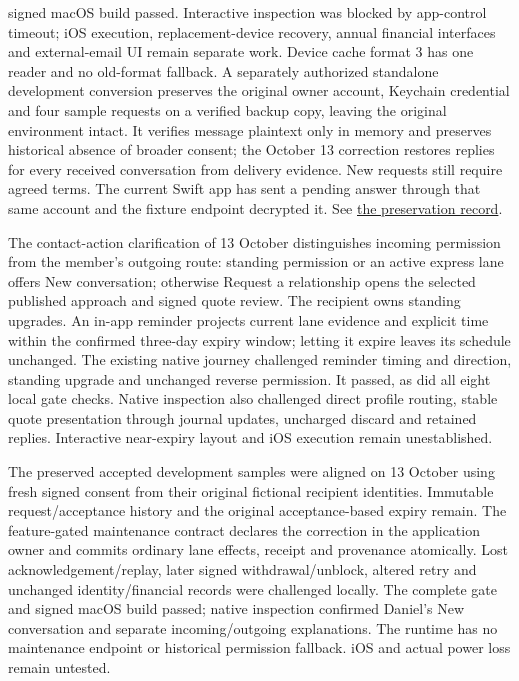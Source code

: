 \documentclass[11pt]{article}
\begin{document}
signed macOS build passed. Interactive inspection was blocked by app-control
timeout; iOS execution, replacement-device recovery, annual financial interfaces
and external-email UI remain separate work. Device cache format 3 has one reader and no old-format fallback. A separately authorized
standalone development conversion preserves the original owner account, Keychain
credential and four sample requests on a verified backup copy, leaving the
original environment intact. It verifies message plaintext only in memory and
preserves historical absence of broader consent; the October 13 correction
restores replies for every received conversation from delivery evidence. New
requests still require agreed terms. The current Swift app has sent a pending answer through that same account
and the fixture endpoint decrypted it. See
\href{tools/development-continuity/README.md}{the preservation record}.

The contact-action clarification of 13 October distinguishes incoming permission
from the member's outgoing route: standing permission or an active express lane
offers New conversation; otherwise Request a relationship opens the selected
published approach and signed quote review. The recipient owns standing upgrades.
An in-app reminder projects current lane evidence and explicit time within the
confirmed three-day expiry window; letting it expire leaves its schedule unchanged.
The existing native journey challenged reminder timing and direction, standing
upgrade and unchanged reverse permission. It passed, as did all eight local gate
checks. Native inspection also challenged direct profile routing, stable quote
presentation through journal updates, uncharged discard and retained replies.
Interactive near-expiry layout and iOS execution remain unestablished.

The preserved accepted development samples were aligned on 13 October using fresh
signed consent from their original fictional recipient identities. Immutable
request/acceptance history and the original acceptance-based expiry remain.
The feature-gated maintenance contract declares the correction in the application
owner and commits ordinary lane effects, receipt and provenance atomically. Lost
acknowledgement/replay, later signed withdrawal/unblock, altered retry and unchanged
identity/financial records were challenged locally. The complete gate and signed
macOS build passed; native inspection confirmed Daniel's New conversation and
separate incoming/outgoing explanations. The runtime has no maintenance endpoint
or historical permission fallback. iOS and actual power loss remain untested.
\end{document}
